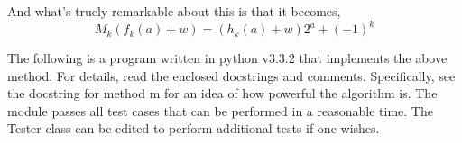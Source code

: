 And what's truely remarkable about this is that it becomes,
$$M_k(f_k(a)+w)=(h_k(a)+w)2^a+(-1)^k$$




\vfill

The following is a program written in python v3.3.2 that implements
the above method.  For details, read the enclosed docstrings and
comments.  Specifically, see the docstring for method m for an idea of
how powerful the algorithm is.  The module passes all test cases that
can be performed in a reasonable time.  The Tester class can be edited
to perform additional tests if one wishes.

\eject



\bye
